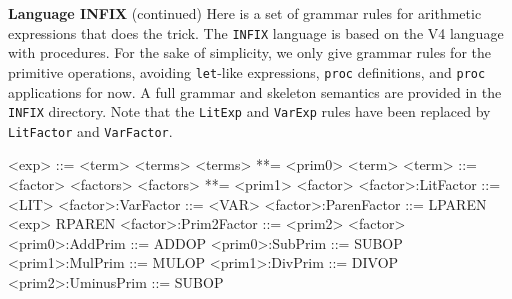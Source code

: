\begin{minipage}[t]{\sw}
\slidenumber
\LARGE
{\bf Language INFIX} (continued)\exx
Here is a set of grammar rules
for arithmetic expressions that does the trick.
The \verb'INFIX' language is based on the V4 language with procedures.
For the sake of simplicity, we only give grammar rules
for the primitive operations,
avoiding \verb'let'-like expressions, \verb'proc' definitions,
and \verb'proc' applications for now.
A full grammar and skeleton semantics are provided
in the \verb'INFIX' directory.
Note that the \verb'LitExp' and \verb'VarExp' rules
have been replaced by \verb'LitFactor' and \verb'VarFactor'.
\begin{qv}
<exp>                ::= <term> <terms>
<terms>              **= <prim0> <term>
<term>               ::= <factor> <factors>
<factors>            **= <prim1> <factor>
<factor>:LitFactor   ::= <LIT>
<factor>:VarFactor   ::= <VAR>
<factor>:ParenFactor ::= LPAREN <exp> RPAREN
<factor>:Prim2Factor ::= <prim2> <factor>
<prim0>:AddPrim      ::= ADDOP
<prim0>:SubPrim      ::= SUBOP
<prim1>:MulPrim      ::= MULOP
<prim1>:DivPrim      ::= DIVOP
<prim2>:UminusPrim   ::= SUBOP
\end{qv}
\end{minipage}
